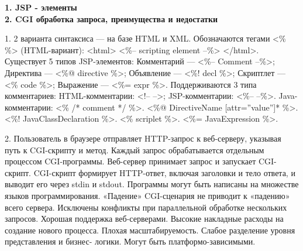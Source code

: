 \documentclass{article}
\begin{document}
\hfill
\begin{minipage}{.3\textwidth}
    \textbf{1. JSP - элементы}\\
    \textbf{2. CGI обработка запроса, преимущества и недостатки}

1. 2 варианта синтаксиса — на базе HTML и XML.
Обозначаются тегами <\% \%> (HTML-вариант): <html>
<\%-- scripting element --\%>
</html>. 
Существует 5 типов JSP-элементов:
Комментарий — <\%-- Comment --\%>; Директива — <\%@ directive \%>; Объявление — <\%! decl \%>; Скриптлет — <\% code \%>; Выражение — <\%= expr \%>.
Поддерживаются 3 типа комментариев: HTML-комментарии: <!-- -->; JSP-комментарии: <\%-- --\%>. Java-комментарии:
<\%
    /* comment */
\%>. <\%@ DirectiveName [attr=”value”]* \%>. <\%! JavaClassDeclaration \%>. <\% scriplet \%>. <\%= JavaExpression \%>. 

2. Пользователь в браузере отправляет HTTP-запрос к веб-серверу, указывая путь к CGI-скрипту и метод. Каждый запрос обрабатывается отдельным процессом CGI-программы. Веб-сервер принимает запрос и запускает CGI-скрипт. CGI-скрипт формирует HTTP-ответ, включая заголовки и тело ответа, и выводит его через stdin и stdout.
Программы могут быть написаны на множестве языков программирования.
«Падение» CGI-сценария не приводит к «падению» всего сервера.
Исключены конфликты при параллельной обработке нескольких запросов.
Хорошая поддержка веб-серверами.
Высокие накладные расходы на создание нового процесса. Плохая масштабируемость.
Слабое разделение уровня представления и бизнес- логики.
Могут быть платформо-зависимыми.
\end{minipage}
\hfill
\end{document}

